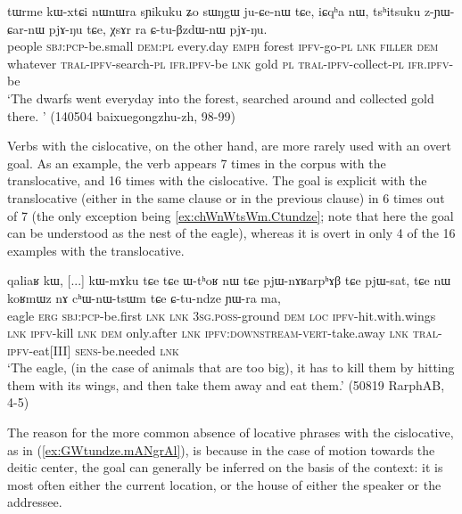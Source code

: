 \begin{exe}
\ex \label{ex:CtuBzdWnW} 
\gll tɯrme kɯ-xtɕi nɯnɯra sɲikuku ʑo sɯŋgɯ ju-ɕe-nɯ tɕe, iɕqʰa nɯ, tsʰitsuku z-ɲɯ-ɕar-nɯ pjɤ-ŋu tɕe, χsɤr ra ɕ-tu-βzdɯ-nɯ pjɤ-ŋu. \\
people \textsc{sbj}:\textsc{pcp}-be.small \textsc{dem}:\textsc{pl} every.day \textsc{emph} forest \textsc{ipfv}-go-\textsc{pl} \textsc{lnk} \textsc{filler} \textsc{dem} whatever \textsc{tral}-\textsc{ipfv}-search-\textsc{pl} \textsc{ifr}.\textsc{ipfv}-be \textsc{lnk} gold \textsc{pl} \textsc{tral}-\textsc{ipfv}-collect-\textsc{pl} \textsc{ifr}.\textsc{ipfv}-be \\
\glt `The dwarfs went everyday into the forest, searched around and collected gold there. ' (140504 baixuegongzhu-zh, 98-99)
\end{exe} 

Verbs with the cislocative, on the other hand, are more rarely used with an overt goal. As an example, the verb  appears 7 times in the corpus with the translocative, and 16 times with the cislocative. The goal is explicit with the translocative (either in the same clause or in the previous clause) in 6 times out of 7 (the only exception being \ref{ex:chWnWtsWm.Ctundze}; note that here the goal can be understood as the nest of the eagle), whereas it is overt in only 4 of the 16 examples with the translocative.

\begin{exe}
\ex \label{ex:chWnWtsWm.Ctundze}
\gll qaliaʁ kɯ, [...] kɯ-mɤku tɕe tɕe ɯ-tʰoʁ nɯ tɕe pjɯ-nɤʁarpʰɤβ tɕe pjɯ-sat,  tɕe nɯ koʁmɯz nɤ cʰɯ-nɯ-tsɯm tɕe ɕ-tu-ndze ɲɯ-ra ma, \\
eagle \textsc{erg} { } \textsc{sbj}:\textsc{pcp}-be.first \textsc{lnk} \textsc{lnk} \textsc{3sg}.\textsc{poss}-ground \textsc{dem} \textsc{loc} \textsc{ipfv}-hit.with.wings \textsc{lnk} \textsc{ipfv}-kill \textsc{lnk} \textsc{dem}  only.after \textsc{lnk} \textsc{ipfv}:\textsc{downstream}-\textsc{vert}-take.away \textsc{lnk} \textsc{tral}-\textsc{ipfv}-eat[III] \textsc{sens}-be.needed \textsc{lnk} \\
\glt `The eagle, (in the case of animals that are too big), it has to kill them by hitting them with its wings, and then take them away and  eat them.' (50819 RarphAB, 4-5)
\end{exe}

The reason for the more common absence of locative phrases with the cislocative, as in (\ref{ex:GWtundze.mANgrAl}), is because in the case of motion towards the deitic center, the goal can generally be inferred on the basis of the context: it is most often either the current location, or the house of either the speaker or the addressee.

